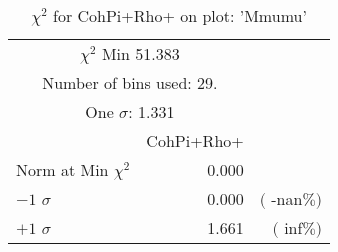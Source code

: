  \begin{table}[h!]\centering
 {\small{
 \begin{tabular}{||l||r||r||}
 \hline
 \hline
\multicolumn{2}{||c||}{$\chi^{2}$ Min  51.383} & \\
 \multicolumn{2}{||c||}{Number of bins used:   29.} & \\
\multicolumn{2}{||c||}{One $\sigma$:    1.331} & \\
 \hline
 \hline
    & CohPi+Rho+ & \\
Norm at Min $\chi^{2}$  &   0.000 & \\
$-1$ $\sigma$ &   0.000  &  $($ -nan$\%)$  \\
$+1$ $\sigma$ &   1.661  &  $($  inf$\%)$  \\
 \hline
 \hline
 \end{tabular}
 \caption{$\chi^{2}$ for CohPi+Rho+ on plot: 'Mmumu'}
 \label{tab-chicohpip}
 }}
 \end{table}
 \endinput
